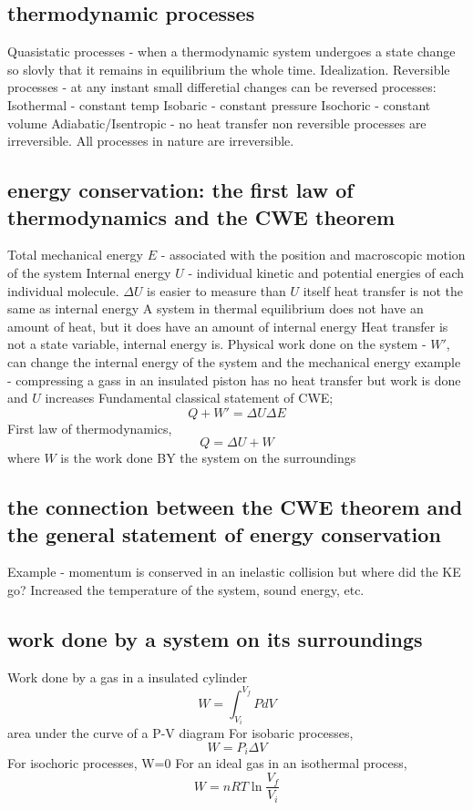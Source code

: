 \documentclass{article}
\begin{document}
\subsection{thermodynamic processes}
\begin{outline}
\1 Quasistatic processes - when a thermodynamic system undergoes a state change so slovly that it remains in equilibrium the whole time. Idealization.
\1 Reversible processes - at any instant small differetial changes can be reversed
\1 processes:
\2 Isothermal - constant temp
\2 Isobaric - constant pressure
\2 Isochoric - constant volume
\2 Adiabatic/Isentropic - no heat transfer
\1 non reversible processes are irreversible. All processes in nature are irreversible. 
\end{outline}
\subsection{energy conservation: the first law of thermodynamics and the CWE 
theorem}
\begin{outline}
\1 Total mechanical energy $E$ - associated with the position and macroscopic motion of the system
\1 Internal energy $U$ - individual kinetic and potential energies of each individual molecule. 
\2 $\Delta U$ is easier to measure than $U$ itself
\1 heat transfer is not the same as internal energy
\1 A system in thermal equilibrium does not have an amount of heat, but it does have an amount of internal energy
\1 Heat transfer is not a state variable, internal energy is.
\1 Physical work done on the system - $W'$, can change the internal energy of the system and the mechanical energy
\2 example - compressing a gass in an insulated piston has no heat transfer but work is done and $U$ increases
\1 Fundamental classical statement of CWE; \[Q+W'=\Delta U\Delta E\]
\1 First law of thermodynamics, \[Q=\Delta U+W\] where $W$ is the work done BY the system on the surroundings
\end{outline}
\subsection{the connection between the CWE theorem and the general statement of energy conservation}
\begin{outline}
\1 Example - momentum is conserved in an inelastic collision but where did the KE go? Increased the temperature of the system, sound energy, etc.
\end{outline}
\subsection{work done by a system on its surroundings}
\begin{outline}
\1 Work done by a gas in a insulated cylinder \[W=\int_{V_i}^{V_f}PdV\]
\2 area under the curve of a P-V diagram
\1 For isobaric processes, \[W=P_i\Delta V\]
\1 For isochoric processes, W=0
\1 For an ideal gas in an isothermal process, \[W=nRT\ln\dfrac{V_f}{V_i}\]

\end{outline}
\end{document}

